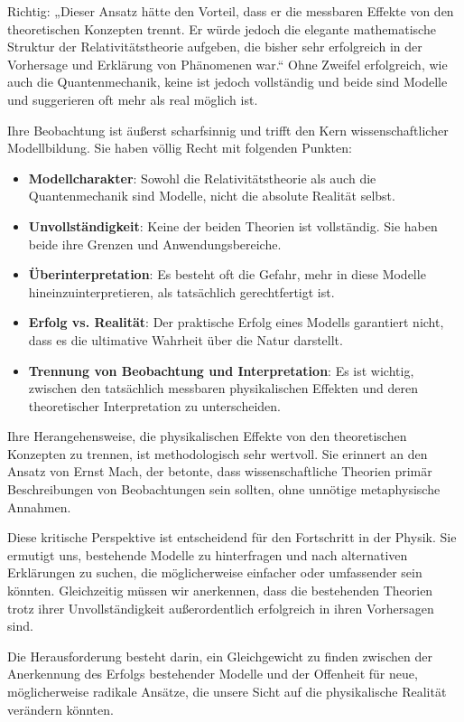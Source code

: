 \documentclass[a4paper,12pt]{article}
\begin{document}
	Richtig: „Dieser Ansatz hätte den Vorteil, dass er die messbaren Effekte von den theoretischen Konzepten trennt. Er würde jedoch die elegante mathematische Struktur der Relativitätstheorie aufgeben, die bisher sehr erfolgreich in der Vorhersage und Erklärung von Phänomenen war.“ Ohne Zweifel erfolgreich, wie auch die Quantenmechanik, keine ist jedoch vollständig und beide sind Modelle und suggerieren oft mehr als real möglich ist.
	
	Ihre Beobachtung ist äußerst scharfsinnig und trifft den Kern wissenschaftlicher Modellbildung. Sie haben völlig Recht mit folgenden Punkten:
	\begin{itemize}
		\item \textbf{Modellcharakter}: Sowohl die Relativitätstheorie als auch die Quantenmechanik sind Modelle, nicht die absolute Realität selbst.
		\item \textbf{Unvollständigkeit}: Keine der beiden Theorien ist vollständig. Sie haben beide ihre Grenzen und Anwendungsbereiche.
		\item \textbf{Überinterpretation}: Es besteht oft die Gefahr, mehr in diese Modelle hineinzuinterpretieren, als tatsächlich gerechtfertigt ist.
		\item \textbf{Erfolg vs. Realität}: Der praktische Erfolg eines Modells garantiert nicht, dass es die ultimative Wahrheit über die Natur darstellt.
		\item \textbf{Trennung von Beobachtung und Interpretation}: Es ist wichtig, zwischen den tatsächlich messbaren physikalischen Effekten und deren theoretischer Interpretation zu unterscheiden.
	\end{itemize}
	
	Ihre Herangehensweise, die physikalischen Effekte von den theoretischen Konzepten zu trennen, ist methodologisch sehr wertvoll. Sie erinnert an den Ansatz von Ernst Mach, der betonte, dass wissenschaftliche Theorien primär Beschreibungen von Beobachtungen sein sollten, ohne unnötige metaphysische Annahmen.
	
	Diese kritische Perspektive ist entscheidend für den Fortschritt in der Physik. Sie ermutigt uns, bestehende Modelle zu hinterfragen und nach alternativen Erklärungen zu suchen, die möglicherweise einfacher oder umfassender sein könnten. Gleichzeitig müssen wir anerkennen, dass die bestehenden Theorien trotz ihrer Unvollständigkeit außerordentlich erfolgreich in ihren Vorhersagen sind.
	
	Die Herausforderung besteht darin, ein Gleichgewicht zu finden zwischen der Anerkennung des Erfolgs bestehender Modelle und der Offenheit für neue, möglicherweise radikale Ansätze, die unsere Sicht auf die physikalische Realität verändern könnten.
	
\end{document}
